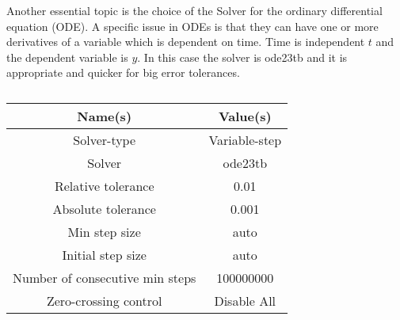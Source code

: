 Another essential topic is the choice of the Solver for the ordinary differential equation (ODE). A specific issue in ODEs is that they can have one or more derivatives of a variable which is dependent on time. Time is independent $t$ and the dependent variable is $y$. In this case the solver is ode23tb and it is appropriate and quicker for big error tolerances.

\begin{table}
\centering
\begin{tabular}{ |c|c| } 
 \hline
 Name(s) & Value(s) \\
 \hline\hline
 Solver-type & Variable-step  \\ 
 Solver & ode23tb \\ 
 Relative tolerance & 0.01 \\ 
 Absolute tolerance & 0.001 \\
 Min step size & auto \\
 Initial step size & auto \\ 
 Number of consecutive min steps & 100000000 \\
 Zero-crossing control & Disable All \\
 \hline
\end{tabular}
\caption{}
\label{tab:config}
\end{table}

